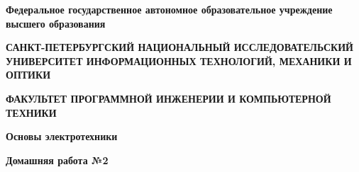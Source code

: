 \documentclass[12pt]{article}
\begin{document}
	\pagestyle{empty}
	\begin{center}
		\normalsize
		\textbf{Федеральное государственное автономное образовательное учреждение высшего образования}

		\small
		\medskip 
		\textbf{САНКТ-ПЕТЕРБУРГСКИЙ НАЦИОНАЛЬНЫЙ ИССЛЕДОВАТЕЛЬСКИЙ  УНИВЕРСИТЕТ ИНФОРМАЦИОННЫХ ТЕХНОЛОГИЙ, МЕХАНИКИ И ОПТИКИ}

		\medskip 
		\textbf{ФАКУЛЬТЕТ ПРОГРАММНОЙ ИНЖЕНЕРИИ И КОМПЬЮТЕРНОЙ ТЕХНИКИ}	
	\bigskip\bigskip\bigskip\bigskip\bigskip\bigskip\bigskip\bigskip\bigskip\bigskip\bigskip\bigskip	
		\par\medskip\par\smallskip\par\smallskip
		\Large 
		\textbf{Основы электротехники} 

		\textbf{Домашняя работа №2}


\end{center}
\end{document}
